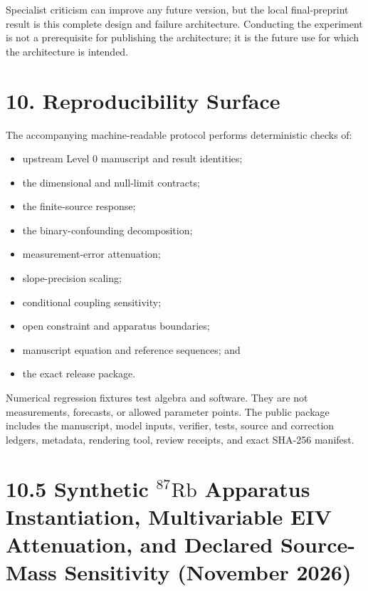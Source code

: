 \documentclass[
  american,
  11pt,
  letterpaper,
]{article}
\providecommand{\tightlist}{%
  \setlength{\itemsep}{0pt}\setlength{\parskip}{0pt}}
\begin{document}
Specialist criticism can improve any future version, but the local final-preprint result is this complete design and failure architecture. Conducting the experiment is not a prerequisite for publishing the architecture; it is the future use for which the architecture is intended.

\section{10. Reproducibility Surface}\label{reproducibility-surface}

The accompanying machine-readable protocol performs deterministic checks of:

\begin{itemize}
\tightlist
\item
  upstream Level 0 manuscript and result identities;
\item
  the dimensional and null-limit contracts;
\item
  the finite-source response;
\item
  the binary-confounding decomposition;
\item
  measurement-error attenuation;
\item
  slope-precision scaling;
\item
  conditional coupling sensitivity;
\item
  open constraint and apparatus boundaries;
\item
  manuscript equation and reference sequences; and
\item
  the exact release package.
\end{itemize}

Numerical regression fixtures test algebra and software. They are not measurements, forecasts, or allowed parameter points. The public package includes the manuscript, model inputs, verifier, tests, source and correction ledgers, metadata, rendering tool, review receipts, and exact SHA-256 manifest.

\section{\texorpdfstring{10.5 Synthetic \(^{87}\mathrm{Rb}\) Apparatus Instantiation, Multivariable EIV Attenuation, and Declared Source-Mass Sensitivity (November 2026)}{10.5 Synthetic \^{}\{87\}\textbackslash mathrm\{Rb\} Apparatus Instantiation, Multivariable EIV Attenuation, and Declared Source-Mass Sensitivity (November 2026)}}\label{synthetic-87mathrmrb-apparatus-instantiation-multivariable-eiv-attenuation-and-declared-source-mass-sensitivity-november-2026}
\end{document}
